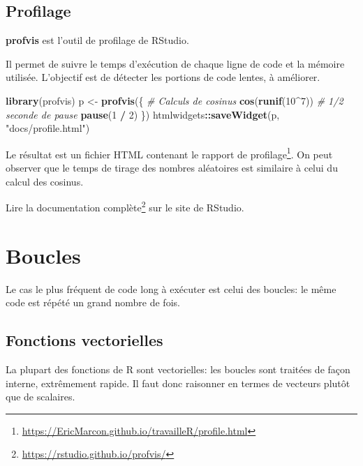 \documentclass[
  12pt,
  french,
  a4paper,
  extrafontsizes,onecolumn,openright
  ]{memoir}
\newenvironment{Shaded}{\begin{snugshade}}{\end{snugshade}}
\newcommand{\CommentTok}[1]{\textcolor[rgb]{0.56,0.35,0.01}{\textit{#1}}}
\newcommand{\DecValTok}[1]{\textcolor[rgb]{0.00,0.00,0.81}{#1}}
\newcommand{\FunctionTok}[1]{\textcolor[rgb]{0.13,0.29,0.53}{\textbf{#1}}}
\newcommand{\NormalTok}[1]{#1}
\newcommand{\OtherTok}[1]{\textcolor[rgb]{0.56,0.35,0.01}{#1}}
\newcommand{\SpecialCharTok}[1]{\textcolor[rgb]{0.81,0.36,0.00}{\textbf{#1}}}
\newcommand{\StringTok}[1]{\textcolor[rgb]{0.31,0.60,0.02}{#1}}
\begin{document}
\subsection{Profilage}\label{profilage}

\textbf{profvis} est l'outil de profilage de RStudio.

Il permet de suivre le temps d'exécution de chaque ligne de code et la mémoire utilisée.
L'objectif est de détecter les portions de code lentes, à améliorer.

\scriptsize

\begin{Shaded}
\begin{Highlighting}[]
\FunctionTok{library}\NormalTok{(profvis)}
\NormalTok{p }\OtherTok{\textless{}{-}} \FunctionTok{profvis}\NormalTok{(\{}
  \CommentTok{\# Calculs de cosinus }
  \FunctionTok{cos}\NormalTok{(}\FunctionTok{runif}\NormalTok{(}\DecValTok{10}\SpecialCharTok{\^{}}\DecValTok{7}\NormalTok{))}
  \CommentTok{\# 1/2 seconde de pause}
  \FunctionTok{pause}\NormalTok{(}\DecValTok{1} \SpecialCharTok{/} \DecValTok{2}\NormalTok{)}
\NormalTok{  \})}
\NormalTok{htmlwidgets}\SpecialCharTok{::}\FunctionTok{saveWidget}\NormalTok{(p, }\StringTok{"docs/profile.html"}\NormalTok{)}
\end{Highlighting}
\end{Shaded}

\normalsize

Le résultat est un fichier HTML contenant le rapport de profilage\footnote{\url{https://EricMarcon.github.io/travailleR/profile.html}}.
On peut observer que le temps de tirage des nombres aléatoires est similaire à celui du calcul des cosinus.

Lire la documentation complète\footnote{\url{https://rstudio.github.io/profvis/}} sur le site de RStudio.

\section{Boucles}\label{boucles}

Le cas le plus fréquent de code long à exécuter est celui des boucles: le même code est répété un grand nombre de fois.

\subsection{Fonctions vectorielles}\label{fonctions-vectorielles}

La plupart des fonctions de R sont vectorielles: les boucles sont traitées de façon interne, extrêmement rapide.
Il faut donc raisonner en termes de vecteurs plutôt que de scalaires.
\end{document}

